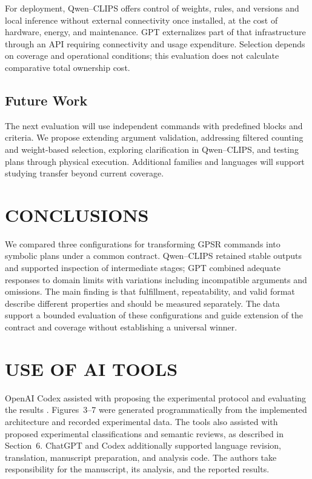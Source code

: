 \documentclass[a4paper,twoside]{article}
\begin{document}
For deployment, Qwen--CLIPS offers control of weights, rules, and versions and local inference without external connectivity once installed, at the cost of hardware, energy, and maintenance. GPT externalizes part of that infrastructure through an API requiring connectivity and usage expenditure. Selection depends on coverage and operational conditions; this evaluation does not calculate comparative total ownership cost.

\subsection{Future Work}
The next evaluation will use independent commands with predefined blocks and criteria. We propose extending argument validation, addressing filtered counting and weight-based selection, exploring clarification in Qwen--CLIPS, and testing plans through physical execution. Additional families and languages will support studying transfer beyond current coverage.

\section{CONCLUSIONS}
We compared three configurations for transforming GPSR commands into symbolic plans under a common contract. Qwen--CLIPS retained stable outputs and supported inspection of intermediate stages; GPT combined adequate responses to domain limits with variations including incompatible arguments and omissions. The main finding is that fulfillment, repeatability, and valid format describe different properties and should be measured separately. The data support a bounded evaluation of these configurations and guide extension of the contract and coverage without establishing a universal winner.





\section*{USE OF AI TOOLS}
OpenAI Codex assisted with proposing the experimental protocol and evaluating the results \cite{openai_assistance}. Figures~3--7 were generated programmatically from the implemented architecture and recorded experimental data. The tools also assisted with proposed experimental classifications and semantic reviews, as described in Section~6. ChatGPT and Codex additionally supported language revision, translation, manuscript preparation, and analysis code. The authors take responsibility for the manuscript, its analysis, and the reported results.



\end{document}
